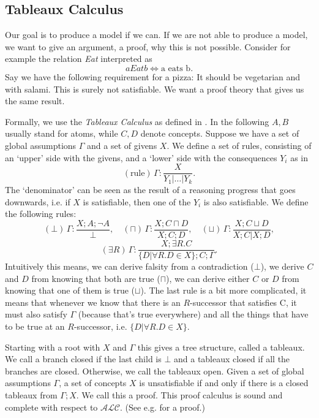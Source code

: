 \subsection{Tableaux Calculus}

Our goal is to produce a model if we can. If we are not able to produce
a model, we want to give an argument, a proof, why this is not possible.
Consider for example the relation \emph{Eat} interpreted as
\[
aEatb \iff \text{a eats b}.
\]
Say we have the following requirement for a pizza: It should be vegetarian
and with salami. This is surely not satisfiable. We want a proof theory
that gives us the same result.

Formally, we use the \emph{Tableaux Calculus} as defined in \cite{gore07}. In the
following $A, B$ usually stand for atoms, while $C,D$ denote concepts. Suppose
we have a set of global assumptions $\Gamma$ and a set of givens $X$. We define
a set of rules, consisting of an `upper' side with the givens, and a `lower' side
with the consequences $Y_i$ as in
\[
(\text{rule}) \, \Gamma: \frac{X}{Y_1 | \dots | Y_k}.
\]
The `denominator' can be seen as the result of a reasoning progress that goes downwards,
i.e. if $X$ is satisfiable, then one of the $Y_i$ is also satisfiable. We define the
following rules:
\[
(\bot) \, \Gamma: \frac{X; A; \lnot A}{\bot}, \quad
(\sqcap) \, \Gamma: \frac{X; C \sqcap D}{X; C; D}, \quad
(\sqcup) \, \Gamma: \frac{X; C \sqcup D}{X; C | X; D},
\]
\[
(\exists R) \, \Gamma: \frac{X; \exists R. C}{\{D | \forall R.D \in X\};  C ; \Gamma}.
\]
Intuitively this means, we can derive falsity from a contradiction ($\bot$), we derive
$C$ and $D$ from knowing that both are true ($\sqcap$), we can derive either $C$ or $D$
from knowing that one of them is true ($\sqcup$). The last rule is a bit more complicated, it
means that whenever we know that there is an $R$-successor that satisfies C, it must
also satisfy $\Gamma$ (because that's true everywhere) and all the things that have
to be true at an $R$-successor, i.e. $\{D | \forall R.D \in X\}$.

Starting with a root with $X$ and $\Gamma$ this gives a tree structure, called a tableaux.
We call a branch closed if the last child is $\bot$ and a tableaux closed if all the
branches are closed. Otherwise, we call the tableaux open. Given a set of global
assumptions $\Gamma$, a set of concepts $X$ is unsatisfiable if and only if there
is a closed tableaux from $\Gamma; X$. We call this a proof. This proof calculus
is sound and complete with respect to $\mathcal{ALC}$. (See e.g. \cite{gore07} for a
proof.)

